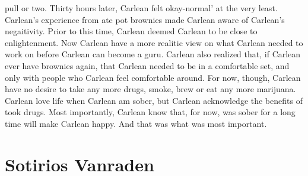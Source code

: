 \documentclass[12pt]{book}
\begin{document}
pull or two. Thirty hours later, Carlean felt okay-normal' at the very least. Carlean's experience from ate pot brownies made Carlean aware of Carlean's negaitivity. Prior to this time, Carlean deemed Carlean to be close to enlightenment. Now Carlean have a more realitic view on what Carlean needed to work on before Carlean can become a guru. Carlean also realized that, if Carlean ever have brownies again, that Carlean needed to be in a comfortable set, and only with people who Carlean feel comfortable around. For now, though, Carlean have no desire to take any more drugs, smoke, brew or eat any more marijuana. Carlean love life when Carlean am sober, but Carlean acknowledge the benefits of took drugs. Most importantly, Carlean know that, for now, was sober for a long time will make Carlean happy. And that was what was most important.



\chapter{Sotirios Vanraden}
\end{document}
